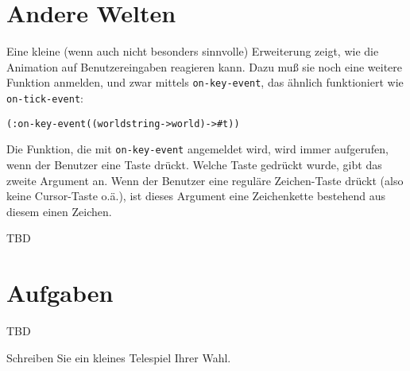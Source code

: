\section{Andere Welten}

Eine kleine (wenn auch nicht besonders sinnvolle) Erweiterung zeigt,
wie die Animation auf Benutzereingaben reagieren kann.  Dazu muß sie
noch eine weitere Funktion anmelden, und zwar mittels
\texttt{on-key-event}, das
ähnlich funktioniert wie \texttt{on-tick-event}:
%
\begin{alltt}
(: on-key-event ((world string -> world) -> #t))
\end{alltt}
%
Die Funktion, die mit \texttt{on-key-event} angemeldet wird, wird
immer aufgerufen, wenn der Benutzer eine Taste drückt.  Welche Taste
gedrückt wurde, gibt das zweite Argument 
an.  Wenn der Benutzer eine reguläre Zeichen-Taste drückt (also keine
Cursor-Taste o.ä.), ist dieses Argument eine Zeichenkette bestehend
aus diesem einen Zeichen.

TBD

\section*{Aufgaben}

TBD

\begin{aufgabe}
  Schreiben Sie ein kleines Telespiel Ihrer Wahl.
\end{aufgabe}


